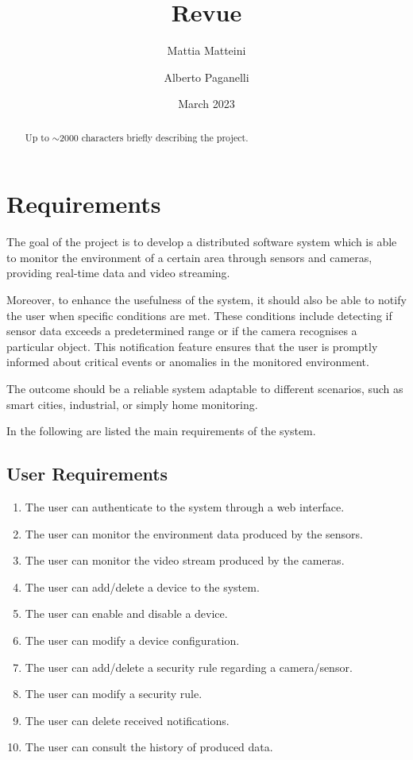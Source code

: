 \documentclass{scrartcl}
\title{
    Revue
}
\author{
    Mattia Matteini \\ \emailaddr{mattia.matteini@studio.unibo.it}
    \and
    Alberto Paganelli \\ \emailaddr{alberto.paganelli3@studio.unibo.it}
}
\date{March 2023}
\begin{document}
    \maketitle

    \begin{abstract}
        Up to $\sim$2000 characters briefly describing the project.
    \end{abstract}


    \section{Requirements}

    The goal of the project is to develop a distributed software system which is able to monitor the environment
    of a certain area through sensors and cameras, providing real-time data and video streaming.

    Moreover, to enhance the usefulness of the system, it should also be able to notify the user when specific
    conditions are met.
    These conditions include detecting if sensor data exceeds a predetermined range or if the camera
    recognises a particular object.
    This notification feature ensures that the user is promptly informed about critical
    events or anomalies in the monitored environment.

    The outcome should be a reliable system adaptable to different scenarios, such as smart cities, industrial, or
    simply home monitoring.

    In the following are listed the main requirements of the system.

    \subsection{User Requirements}\label{subsec:user-requirements}

    \begin{enumerate}
        \item \label{itm:user-1} The user can authenticate to the system through a web interface.
        \item \label{itm:user-2} The user can monitor the environment data produced by the sensors.
        \item \label{itm:user-3} The user can monitor the video stream produced by the cameras.
        \item \label{itm:user-4} The user can add/delete a device to the system.
        \item \label{itm:user-5} The user can enable and disable a device.
        \item \label{itm:user-6} The user can modify a device configuration.
        \item \label{itm:user-7} The user can add/delete a security rule regarding a camera/sensor.
        \item \label{itm:user-8} The user can modify a security rule.
        \item \label{itm:user-9} The user can delete received notifications.
        \item \label{itm:user-10} The user can consult the history of produced data.
    \end{enumerate}
\end{document}
